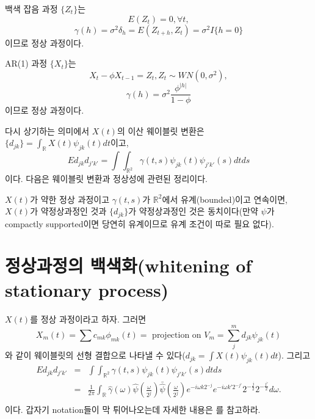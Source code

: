 \documentclass[b5paper,]{scrbook}
\theoremstyle{plain}
\theoremstyle{definition}
\numberwithin{equation}{section}
\let\BeginKnitrBlock\begin \let\EndKnitrBlock\end
\begin{document}
\BeginKnitrBlock{example}[백색 잡음 과정]
\protect\hypertarget{exm:unnamed-chunk-320}{}{\label{exm:unnamed-chunk-320} {} }백색 잡음 과정 \(\{Z_{t}\}\)는
\[E(Z_{t})=0, \forall t,\]
\[\gamma(h)=\sigma^{2}\delta_{h}=E(Z_{t+h},Z_{t})=\sigma^{2}I\{h=0\}\]
이므로 정상 과정이다.
\EndKnitrBlock{example}

\BeginKnitrBlock{example}[AR(1) 과정]
\protect\hypertarget{exm:unnamed-chunk-321}{}{\label{exm:unnamed-chunk-321} {} }AR(1) 과정 \(\{X_{t}\}\)는
\[X_{t}-\phi X_{t-1}=Z_{t}, Z_{t} \sim WN(0,\sigma^{2}), \]
\[\gamma(h)=\sigma^{2}\frac{\phi^{|h|}}{1-\phi}\]
이므로 정상 과정이다.
\EndKnitrBlock{example}

다시 상기하는 의미에서 \(X(t)\)의 이산 웨이블릿 변환은 \(\{ d_{jk} \}=\int_{\mathbb{R}}X(t)\psi_{jk}(t)dt\)이고,
\[E d_{jk}d_{j'k'}=\int \int_{\mathbb{R}^{2}}\gamma(t,s)\psi_{jk}(t)\psi_{j'k'}(s)dtds\]
이다. 다음은 웨이블릿 변환과 정상성에 관련된 정리이다.

\BeginKnitrBlock{theorem}[약정상과정 관련 정리]
\protect\hypertarget{thm:unnamed-chunk-322}{}{\label{thm:unnamed-chunk-322} {} }\(X(t)\)가 약한 정상 과정이고 \(\gamma(t,s)\)가 \(\mathbb{R}^{2}\)에서 유계(bounded)이고 연속이면, \(X(t)\)가 약정상과정인 것과 \(\{ d_{jk} \}\)가 약정상과정인 것은 동치이다(만약 \(\psi\)가 compactly supported이면 당연히 유계이므로 유계 조건이 따로 필요 없다).
\EndKnitrBlock{theorem}

\hypertarget{-whitening-of-stationary-process}{%
\section{정상과정의 백색화(whitening of stationary process)}\label{-whitening-of-stationary-process}}

\(X(t)\)를 정상 과정이라고 하자. 그러면
\[X_{m}(t)=\sum c_{mk}\phi_{mk}(t)=\text{ projection on $V_{m}$}=\sum_{j}^{m}d_{jk}\psi_{jk}(t)\]
와 같이 웨이블릿의 선형 결합으로 나타낼 수 있다(\(d_{jk}=\int X(t)\psi_{jk}(t)dt\)). 그리고
\begin{eqnarray*}
E d_{jk}d_{j'k'}&=&\int \int_{\mathbb{R}^{2}}\gamma(t,s)\psi_{jk}(t)\psi_{j'k'}(s)dtds\\
&=&\frac{1}{2 \pi}\int_{\mathbb{R}}\hat{\gamma}(\omega)\hat{\psi}(\frac{\omega}{2^{j}})\bar{\hat{\psi}}(\frac{\omega}{2^{j}})e^{-i\omega k 2^{-j}}e^{-i\omega k' 2^{-j'}}2^{-\frac{j}{2}}2^{-\frac{j'}{2}}d\omega.\\
\end{eqnarray*}
이다. 갑자기 notation들이 막 튀어나오는데 자세한 내용은 \citep{Zhang1994}를 참고하라.
\end{document}

